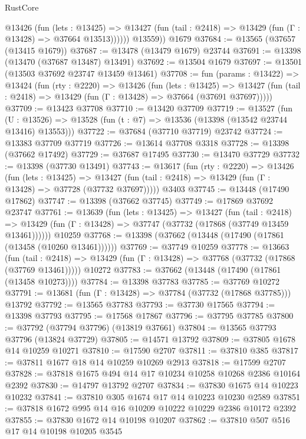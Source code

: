 \begin{lexlean}{RustCore}
\begin{coremodule}
            @13426
              (fun (lets : @13425) =>
              @13427 (fun (tail : @2418) => @13429 (fun (Γ : @13428) => @37664 @13513))))))
        @13559))
    @1679
@37684 := @13565 (@37657 (@13415 @1679))
@37687 := @13478 (@13479 @1679) @23744
@37691 := @13398 (@13470 (@37687 @13487) @13491)
@37692 := @13504 @1679
@37697 := @13501 (@13503 @37692 @23747 @13459 @13461)
@37708 := fun (params : @13422) =>
  @13424
    (fun (rty : @2220) =>
    @13426
      (fun (lets : @13425) =>
      @13427 (fun (tail : @2418) => @13429 (fun (Γ : @13428) => @37664 (@37691 @37697)))))
@37709 := @13423 @37708
@37710 := @13420 @37709
@37719 := @13527
    (fun (U : @13526) => @13528 (fun (t : @7) => @13536 (@13398 (@13542 @23744 @13416) @13553)))
@37722 := @37684 (@37710 @37719) @23742
@37724 := @13383 @37709 @37719
@37726 := @13614 @37708 @3318
@37728 := @13398 (@37662 @17492)
@37729 := @37687 @17495
@37730 := @13470 @37729
@37732 := @13398 (@37730 @13491)
@37743 := @13617
    (fun (rty : @2220) =>
    @13426
      (fun (lets : @13425) =>
      @13427 (fun (tail : @2418) => @13429 (fun (Γ : @13428) => @37728 (@37732 @37697)))))
    @3403
@37745 := @13448 (@17490 @17862)
@37747 := @13398 (@37662 @37745)
@37749 := @17869 @37692 @23747
@37761 := @13639
    (fun (lets : @13425) =>
    @13427
      (fun (tail : @2418) =>
      @13429 (fun (Γ : @13428) => @37747 (@37732 (@17868 (@37749 @13459 @13461))))))
    @10259
@37768 := @13398 (@37662 (@13448 (@17490 (@17861 (@13458 (@10260 @13461))))))
@37769 := @37749 @10259
@37778 := @13663
    (fun (tail : @2418) => @13429 (fun (Γ : @13428) => @37768 (@37732 (@17868 (@37769 @13461)))))
    @10272
@37783 := @37662 (@13448 (@17490 (@17861 (@13458 @10273))))
@37784 := @13398 @37783
@37785 := @37769 @10272
@37791 := @13681 (fun (Γ : @13428) => @37784 (@37732 (@17868 @37785))) @13792
@37792 := @13565 @37783
@37793 := @37730 @17565
@37794 := @13398 @37793
@37795 := @17568 @17867
@37796 := @37795 @37785
@37800 := @37792 (@37794 @37796) (@13819 @37661)
@37804 := @13565 @37793 @37796 (@13824 @37729)
@37805 := @14571 @13792
@37809 := @37805 @1678 @14 @10259 @10271
@37810 := @17590 @2707
@37811 := @37810 @385
@37817 := @37811 @1677 @18 @14 @10259 @10269 @2913
@37818 := @17599 @2707
@37828 := @37818 @1675 @494 @14 @17 @10234 @10258 @10268 @2386 @10164 @2392
@37830 := @14797 @13792 @2707
@37834 := @37830 @1675 @14 @10223 @10232
@37841 := @37810 @305 @1674 @17 @14 @10223 @10230 @2589
@37851 := @37818 @1672 @995 @14 @16 @10209 @10222 @10229 @2386 @10172 @2392
@37855 := @37830 @1672 @14 @10198 @10207
@37862 := @37810 @507 @516 @17 @14 @10198 @10205 @3545

\end{coremodule}
\end{lexlean}
